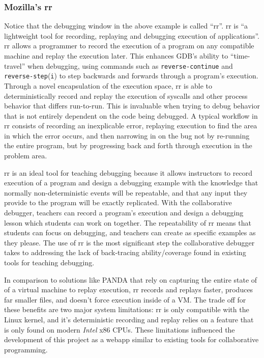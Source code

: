 \documentclass[12pt]{article}
\begin{document}
\subsubsection{Mozilla's rr}\label{rr}

Notice that the debugging window in the above example is called
``rr''. rr is ``a lightweight tool for recording, replaying and
debugging execution of applications''\cite{rr-repo}. rr allows a
programmer to record the execution of a program on any compatible
machine and replay the execution later.  This enhances GDB's ability
to ``time-travel'' when debugging, using commands such as
\lstinline{reverse-continue} and
\lstinline{reverse-step}(\lstinline{i})\cite{gdbman} to step backwards
and forwards through a program's execution.  Through a novel
encapsulation of the execution space, rr is able to deterministically
record and replay the execution of syscalls and other process behavior
that differs run-to-run.  This is invaluable when trying to debug
behavior that is not entirely dependent on the code being debugged.  A
typical workflow in rr consists of recording an inexplicable error,
replaying execution to find the area in which the error occurs, and
then narrowing in on the bug not by re-running the entire program, but
by progressing back and forth through execution in the problem area.
\par

rr is an ideal tool for teaching debugging because it allows
instructors to record execution of a program and design a debugging
example with the knowledge that normally non-deterministic events will
be repeatable, and that any input they provide to the program will be
exactly replicated.  With the collaborative debugger, teachers can
record a program's execution and design a debugging lesson which
students can work on together.  The repeatability of rr means that
students can focus on debugging, and teachers can create as specific
examples as they please.  The use of rr is the most significant step
the collaborative debugger takes to addressing the lack of
back-tracing ability/coverage found in existing tools for teaching
debugging\cite{10.1145/3286960.3286970}.

In comparison to solutions like PANDA\cite{10.1145/2843859.2843867}
that rely on capturing the entire state of of a virtual machine to
replay execution, rr records and replays faster, produces far smaller
files, and doesn't force execution inside of a
VM.\cite{DBLP:journals/corr/OCallahanJFHNP17} The trade off for these
benefits are two major system limitations: rr is only compatible with
the Linux kernel, and it's deterministic recording and replay relies
on a feature that is only found on modern \textit{Intel} x86 CPUs.
These limitations influenced the development of this project as a
webapp similar to existing tools for collaborative programming.
\par
\end{document}
